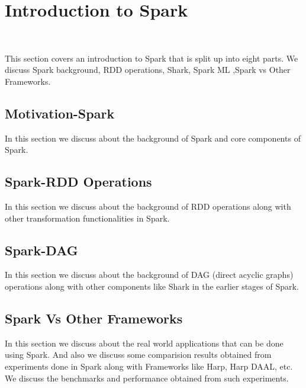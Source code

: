 \section{Introduction to Spark}
\label{c:spark}
\FILENAME\

This section covers an introduction to Spark that is split up
into eight parts. We discuss Spark background, RDD operations,
Shark, Spark ML ,Spark vs Other Frameworks.

\subsection{Motivation-Spark}
\label{s:motivation-spark}

In this section we discuss about the background of Spark and
core components of Spark.

\subsection{Spark-RDD Operations}

In this section we discuss about the background of RDD operations
along with other transformation functionalities in Spark.

\subsection{Spark-DAG}

In this section we discuss about the background of DAG (direct acyclic
graphs) operations along with other components like Shark in the
earlier stages of Spark.

\subsection{Spark Vs Other Frameworks}

In this section we discuss about the real world applications that can
be done using Spark.  And also we discuss some comparision results
obtained from experiments done in Spark along with Frameworks like
Harp, Harp DAAL, etc. We discuss the benchmarks and performance
obtained from such experiments.


